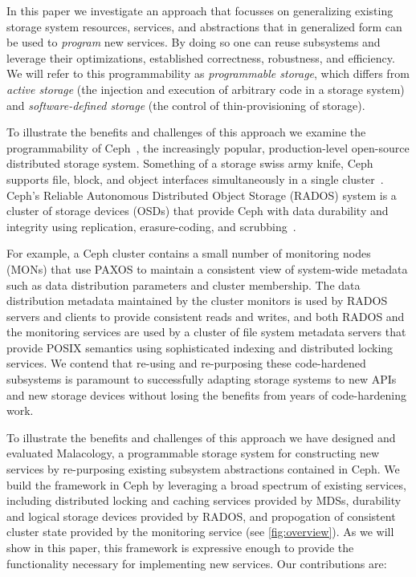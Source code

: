 \documentclass[10pt,twocolumn]{article}
\begin{document}
In this paper we investigate an approach that focusses on generalizing
existing storage system resources, services, and abstractions that in
generalized form can be used to \emph{program} new services. By doing so
one can reuse subsystems and leverage their optimizations,
established correctness, robustness, and efficiency. We will refer to
this programmability as \emph{programmable storage}, which differs from
\emph{active storage} (the injection and execution of arbitrary code in
a storage system) and \emph{software-defined storage} (the control of
thin-provisioning of storage).

To illustrate the benefits and challenges of this approach we examine
the programmability of Ceph~\cite{weil:osdi2006-ceph}, the increasingly
popular, production-level open-source distributed storage system.
Something of a storage swiss army knife, Ceph supports file, block, and
object interfaces simultaneously in a single cluster~\cite{ceph_contributors_ceph_2010}. Ceph's Reliable Autonomous 
Distributed Object Storage (RADOS) system is a cluster of storage
devices (OSDs) that provide Ceph with data durability and integrity
using replication, erasure-coding, and scrubbing~\cite{weil_rados_2007}. 


For example, a Ceph cluster contains a small number of
monitoring nodes (MONs) that use PAXOS to maintain a consistent view of
system-wide metadata such as data distribution parameters and cluster
membership. The data distribution metadata maintained by
the cluster monitors is used by RADOS servers and clients to provide
consistent reads and writes, and both RADOS and the monitoring services
are used by a cluster of file system metadata servers that provide POSIX
semantics using sophisticated indexing and distributed locking services.
We contend that re-using and re-purposing these code-hardened subsystems
is paramount to successfully adapting storage systems to new APIs and
new storage devices without losing the benefits from years of
code-hardening work.

To illustrate the benefits and challenges of this approach we have
designed and evaluated Malacology, a programmable storage system for
constructing new services by re-purposing existing subsystem
abstractions contained in Ceph. We build the framework in Ceph by
leveraging a broad spectrum of existing services, including distributed
locking and caching services provided by MDSs, durability and logical
storage devices provided by RADOS, and propogation of consistent cluster
state provided by the monitoring service (see \ref{fig:overview}). As we will show in this paper, this framework is expressive enough to provide the
functionality necessary for implementing new services. Our contributions
are:
\end{document}
